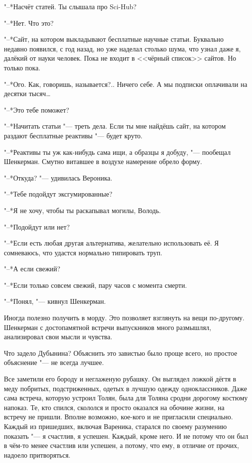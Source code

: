 "--*Насчёт статей.
Ты слышала про Sci-Hub?

"--*Нет.
Что это?

"--*Сайт, на котором выкладывают бесплатные научные статьи.
Буквально недавно появился, с год назад, но уже наделал столько шума, что узнал даже я, далёкий от науки человек.
Пока не входит в <<чёрный список>> сайтов.
Но только пока.

"--*Ого.
Как, говоришь, называется?..
Ничего себе.
А мы подписки оплачивали на десятки тысяч\ldots{}

"--*Это тебе поможет?

"--*Начитать статьи "--- треть дела.
Если ты мне найдёшь сайт, на котором раздают бесплатные реактивы "--- будет круто.

"--*Реактивы ты уж как-нибудь сама ищи, а образцы я добуду, "--- пообещал Шенкерман.
Смутно витавшее в воздухе намерение обрело форму.

"--*Откуда? "--- удивилась Вероника.

"--*Тебе подойдут эксгумированные?

"--*Я не хочу, чтобы ты раскапывал могилы, Володь.

"--*Подойдут или нет?

"--*Если есть любая другая альтернатива, желательно использовать её.
Я сомневаюсь, что удастся нормально типировать труп.

"--*А если свежий?

"--*Если только совсем свежий, пару часов с момента смерти.

"--*Понял, "--- кивнул Шенкерман.

\asterism

Иногда полезно получить в морду.
Это позволяет взглянуть на вещи по-другому.
Шенкерман с достопамятной встречи выпускников много размышлял, анализировал свои мысли и чувства.

Что задело Дубынина?
Объяснить это завистью было проще всего, но простое объяснение "--- не всегда лучшее.

Все заметили его бороду и неглаженую рубашку.
Он выглядел ложкой дёгтя в меду побритых, подстриженных, одетых в лучшую одежду одноклассников.
Даже сама встреча, которую устроил Толян, была для Толяна сродни дорогому костюму напоказ.
Те, кто спился, скололся и просто оказался на обочине жизни, на встречу не пришли.
Вполне возможно, кое-кого и не пригласили специально.
Каждый из пришедших, включая Вареника, старался по своему разумению показать "--- я счастлив, я успешен.
Каждый, кроме него.
И не потому что он был в чём-то менее счастлив или успешен, а потому, что ему, в отличие от прочих, надоело притворяться.

